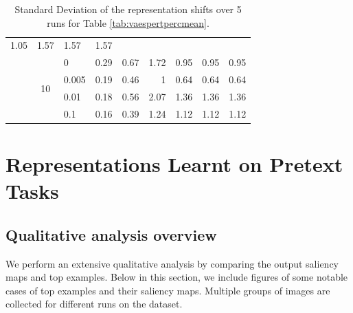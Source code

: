 \begin{table}[htbp]
\begin{tabular}{|c|clrrrrrr|}
      \cellcolor[rgb]{ .733,  .855,  .557}1.05 &
      \cellcolor[rgb]{ .584,  .808,  .525}1.57 &
      \cellcolor[rgb]{ .584,  .808,  .525}1.57 &
      \cellcolor[rgb]{ .584,  .808,  .525}1.57
      \\
\cmidrule{2-9}     &
      \multirow{4}[2]{*}{10} &
      0 &
      \cellcolor[rgb]{ .961,  .925,  .604}0.29 &
      \cellcolor[rgb]{ .839,  .886,  .58}0.67 &
      \cellcolor[rgb]{ .502,  .78,  .51}1.72 &
      \cellcolor[rgb]{ .749,  .859,  .561}0.95 &
      \cellcolor[rgb]{ .749,  .859,  .561}0.95 &
      \cellcolor[rgb]{ .749,  .859,  .561}0.95
      \\
     &
       &
      0.005 &
      \cellcolor[rgb]{ .992,  .937,  .612}0.19 &
      \cellcolor[rgb]{ .906,  .91,  .592}0.46 &
      \cellcolor[rgb]{ .733,  .855,  .557}1 &
      \cellcolor[rgb]{ .847,  .89,  .58}0.64 &
      \cellcolor[rgb]{ .847,  .89,  .58}0.64 &
      \cellcolor[rgb]{ .847,  .89,  .58}0.64
      \\
     &
       &
      0.01 &
      \cellcolor[rgb]{ .996,  .937,  .612}0.18 &
      \cellcolor[rgb]{ .875,  .898,  .588}0.56 &
      \cellcolor[rgb]{ .388,  .745,  .482}2.07 &
      \cellcolor[rgb]{ .616,  .82,  .533}1.36 &
      \cellcolor[rgb]{ .616,  .82,  .533}1.36 &
      \cellcolor[rgb]{ .616,  .82,  .533}1.36
      \\
     &
       &
      0.1 &
      \cellcolor[rgb]{ 1,  .937,  .612}0.16 &
      \cellcolor[rgb]{ .929,  .918,  .6}0.39 &
      \cellcolor[rgb]{ .655,  .831,  .541}1.24 &
      \cellcolor[rgb]{ .694,  .843,  .549}1.12 &
      \cellcolor[rgb]{ .694,  .843,  .549}1.12 &
      \cellcolor[rgb]{ .694,  .843,  .549}1.12
      \\
    \bottomrule
    \end{tabular}%
  \caption{ Standard Deviation of the representation shifts over 5 runs for Table \ref{tab:vaespertpercmean}. 
  }
\label{tab:vaespertpercstd}%
\end{table}%



\section{Representations Learnt on Pretext Tasks}
\vspace{-1mm}
\subsection{Qualitative analysis overview}
\label{app:qualitativeanalysis}
    We perform an extensive qualitative analysis by comparing the output saliency maps and top examples. Below in this section, we include figures of some notable cases of top examples and their saliency maps. Multiple groups of images are collected for different runs on the dataset. 
    
